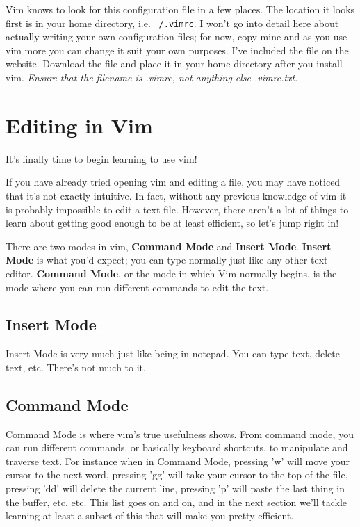 Vim knows to look for this configuration file in a few places. The location 
it looks first is in your home directory, i.e. \texttt{~/.vimrc}. I won't
go into detail here about actually writing your own configuration files;
for now, copy mine and as you use vim more you can change it suit
your own purposes. I've included the file on the website. %
Download the file and place it in your home directory after you install vim.
{\em Ensure that the filename is .vimrc, not anything else .vimrc.txt}.

\section{Editing in Vim}
It's finally time to begin learning to use vim!

If you have already tried opening vim and editing a file, you may have
noticed that it's not exactly intuitive. In fact, without any previous
knowledge of vim it is probably impossible to edit a text file. However,
there aren't a lot of things to learn about getting good enough
to be at least efficient, so let's jump right in!

There are two modes in vim, {\bf Command Mode} and {\bf Insert Mode}.
{\bf Insert Mode} is what you'd expect; you can type normally just
like any other text editor. {\bf Command Mode}, or the mode in which
Vim normally begins, is the mode where you can run different commands
to edit the text. 

\subsection{Insert Mode}
Insert Mode is very much just like being in notepad. You can type text, delete
text, etc. There's not much to it. 

\subsection{Command Mode}
Command Mode is where vim's true usefulness shows. From command mode, you can run
different commands, or basically keyboard shortcuts, to manipulate and traverse
text. For instance when in Command Mode, pressing 'w' will move your cursor
to the next word, pressing 'gg' will take your cursor to the top of the file,
pressing 'dd' will delete the current line, pressing 'p' will paste the last
thing in the buffer, etc. etc. This list goes on and on, and in the next section
we'll tackle learning at least a subset of this that will make you pretty efficient.

